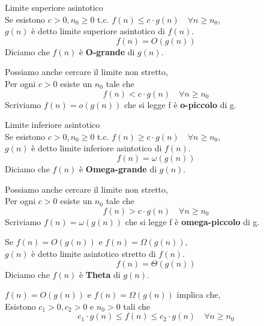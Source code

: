 \documentclass{article}
\begin{document}
\begin{dfn}{Limite superiore asintotico}\\
    Se esistono \(c > 0, n_0 \geq 0\) t.c. \(f(n) \leq c \cdot g(n) \quad \forall n \geq n_0\), \\
    \(g(n)\) è detto limite superiore asintotico di \(f(n)\).
    \[f(n) = O\left(g(n)\right)\]
    Diciamo che \(f(n)\) è \textbf{O-grande} di \(g(n)\).
    
    \vspace*{.25cm}

    \noindent Possiamo anche cercare il limite non stretto, \\
    Per ogni \(c > 0\) esiste un \(n_0\) tale che
    \[f(n) < c \cdot g(n) \quad \forall n \geq n_0\]
    Scriviamo \(f(n) = o\left(g(n)\right)\) che si legge f è \textbf{o-piccolo} di g.
\end{dfn}
\vspace*{.5cm}
\begin{dfn}{Limite inferiore asintotico}\\
    Se esistono \(c > 0, n_0 \geq 0\) t.c. \(f(n) \geq c \cdot g(n) \quad \forall n \geq n_0\), \\
    \(g(n)\) è detto limite inferiore asintotico di \(f(n)\).
    \[f(n) = \omega\left(g(n)\right)\]
    Diciamo che \(f(n)\) è \textbf{Omega-grande} di \(g(n)\).

    \vspace*{.25cm}

    \noindent Possiamo anche cercare il limite non stretto, \\
    Per ogni \(c > 0\) esiste un \(n_0\) tale che
    \[f(n) > c \cdot g(n) \quad \forall n \geq n_0\]
    Scriviamo \(f(n) = \omega\left(g(n)\right)\) che si legge f è \textbf{omega-piccolo} di g.
\end{dfn}
\vspace*{.5cm}
\begin{dfn}
    Se \(f(n) = O\left(g(n)\right)\) e \(f(n) = \Omega\left(g(n)\right)\), \\
    \(g(n)\) è detto limite asintotico stretto di \(f(n)\).
    \[f(n) = \Theta\left(g(n)\right)\]
    Diciamo che \(f(n)\) è \textbf{Theta} di \(g(n)\).
\end{dfn}
\begin{oss}
    \(f(n) = O\left(g(n)\right)\) e \(f(n) = \Omega\left(g(n)\right)\) implica che, \\
    Esistono \(c_1 > 0, c_2 > 0\) e \(n_0 > 0\) tali che
    \[c_1 \cdot g(n) \leq f(n) \leq c_2 \cdot g(n) \quad \forall n \geq n_0\]
\end{oss}
\end{document}
